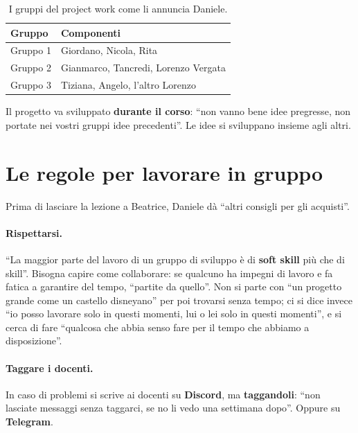 \begin{table}[htbp]
\centering
\begin{tabular}{@{}ll@{}}
\toprule
\textbf{Gruppo} & \textbf{Componenti} \\
\midrule
Gruppo 1 & Giordano, Nicola, Rita \\
Gruppo 2 & Gianmarco, Tancredi, Lorenzo Vergata \\
Gruppo 3 & Tiziana, Angelo, l'altro Lorenzo \\
\bottomrule
\end{tabular}
\caption{I gruppi del project work come li annuncia Daniele\protect\footnotemark.}
\label{a7:tab:gruppi}
\end{table}

Il progetto va sviluppato \textbf{durante il corso}: ``non vanno bene idee
pregresse, non portate nei vostri gruppi idee precedenti''. Le idee si sviluppano
insieme agli altri.

\section{Le regole per lavorare in gruppo}
\label{a7:sec:regole}

Prima di lasciare la lezione a Beatrice, Daniele dà ``altri consigli per gli
acquisti''.

\paragraph{Rispettarsi.} ``La maggior parte del lavoro di un gruppo di sviluppo è di
\textbf{soft skill} più che di skill''. Bisogna capire come collaborare: se qualcuno
ha impegni di lavoro e fa fatica a garantire del tempo, ``partite da quello''. Non
si parte con ``un progetto grande come un castello disneyano'' per poi trovarsi
senza tempo; ci si dice invece ``io posso lavorare solo in questi momenti, lui o lei
solo in questi momenti'', e si cerca di fare ``qualcosa che abbia senso fare per il
tempo che abbiamo a disposizione''.

\paragraph{Taggare i docenti.} In caso di problemi si scrive ai docenti su
\textbf{Discord}, ma \textbf{taggandoli}: ``non lasciate messaggi senza taggarci,
se no li vedo una settimana dopo''. Oppure su \textbf{Telegram}.

